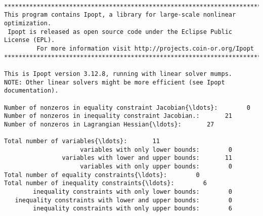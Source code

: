     
    \begin{Verbatim}[commandchars=\\\{\}]

******************************************************************************
This program contains Ipopt, a library for large-scale nonlinear optimization.
 Ipopt is released as open source code under the Eclipse Public License (EPL).
         For more information visit http://projects.coin-or.org/Ipopt
******************************************************************************

This is Ipopt version 3.12.8, running with linear solver mumps.
NOTE: Other linear solvers might be more efficient (see Ipopt documentation).

Number of nonzeros in equality constraint Jacobian{\ldots}:        0
Number of nonzeros in inequality constraint Jacobian.:       21
Number of nonzeros in Lagrangian Hessian{\ldots}:       27

Total number of variables{\ldots}:       11
                     variables with only lower bounds:        0
                variables with lower and upper bounds:       11
                     variables with only upper bounds:        0
Total number of equality constraints{\ldots}:        0
Total number of inequality constraints{\ldots}:        6
        inequality constraints with only lower bounds:        0
   inequality constraints with lower and upper bounds:        0
        inequality constraints with only upper bounds:        6


\end{Verbatim}
